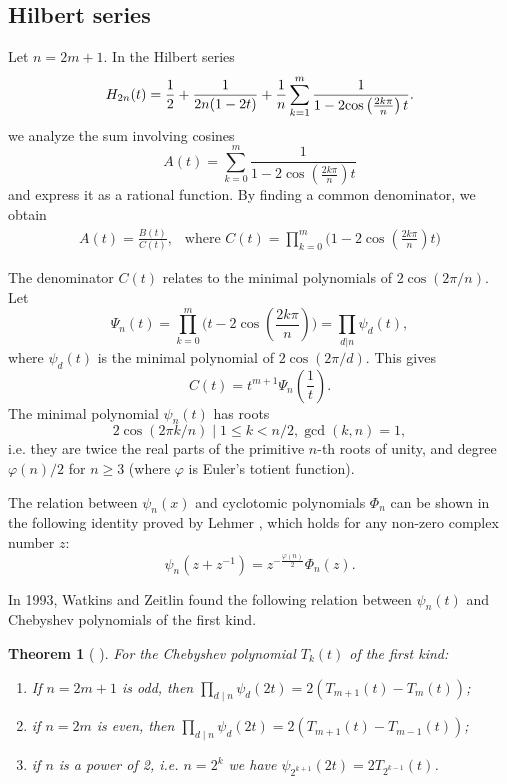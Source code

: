 \documentclass{amsart}[12pt]
\newtheorem{theorem}{Theorem}%
\theoremstyle{definition}
\begin{document}
\subsection{Hilbert series }


Let $n=2m+1$. In the Hilbert series
\begin{align*}
		H_{2n}(t) =\frac{1}{2}+\frac{1}{2n(1-2t)}+\frac{1}{n}\sum_{k=1}^{m}\frac{1}{1-2\text{\rm cos}\left(\frac{2k\pi}{n}\right)t}.
	\end{align*}
we analyze the sum involving cosines
\[
A(t)=\sum_{k=0}^{m}\frac{1}{1-2\cos(\frac{2k\pi}{n})t}
\]
and express it as a rational function. By finding a common denominator, we obtain
\begin{align*}
A(t)= \frac{B(t)}{C(t)},\ \ \text{ where } C(t)=\prod_{k=0}^{m} {\big(1-2\cos(\frac{2k\pi}{n})t \big)} 	
\end{align*}

The denominator $C(t)$ relates to the minimal polynomials of $2\cos(2\pi/n)$. Let
\[
\Psi_n(t)= \prod_{k=0}^{m} {\big(t-2\cos(\frac{2k\pi}{n}) \big)} =\prod_{d|n} \psi_d(t),
\]
 where $\psi_d(t)$ is the minimal polynomial of $2\cos(2\pi/d)$. This gives
\[
C(t)=t^{m+1}\Psi_n(\frac{1}{t}).
\]
The minimal polynomial $\psi_n(t)$ has roots
\[
2\cos(2\pi k/n) \mid 1 \leq k < n/2, \gcd(k,n)=1,
\]
i.e. they are  twice the real parts of the primitive $n$-th roots of unity, and degree $\varphi(n)/2$ for $n \geq 3$ (where $\varphi$ is Euler's totient function).

The relation between $\psi_{n}(x) $ and cyclotomic polynomials $\Phi_{n} $ can be shown in the following identity proved by Lehmer \cite{Leh}, which holds for any non-zero complex number $z$:
\[
\psi_{n}\left(z+z^{-1}\right)=z^{-{\frac {\varphi (n)}{2}}}\Phi _{n}(z).
\]

In 1993, Watkins and Zeitlin \cite{WZ} found the following relation between $\psi_{n}(t)$ and Chebyshev polynomials of the first kind.
\begin{theorem} [ \cite{WZ}]
	For the Chebyshev polynomial $T_k(t)$ of the first kind:
	\begin{enumerate}
		\item If $n = 2m + 1$ is odd, then $ \prod _{d\mid n}\psi _{d}(2t)=2(T_{m+1}(t)-T_{m}(t))$;
		
		\item if $n = 2 m$  is even, then $\prod _{d\mid n}\psi _{d}(2t)=2(T_{m+1}(t)-T_{m-1}(t))$;
		
		\item 	if $n$ is a power of 2, i.e. $n=2^k$ we have  $\psi _{2^{k+1}}(2t)=2T_{2^{k-1}}(t)$.
	\end{enumerate}
	
\end{theorem}
\end{document}

